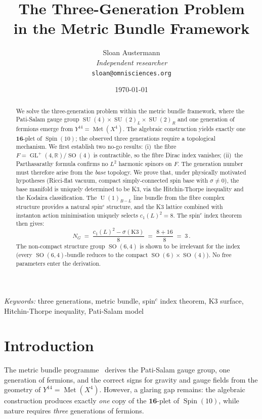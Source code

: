 \documentclass[12pt,a4paper]{article}
\title{\textbf{The Three-Generation Problem\\ in the Metric Bundle Framework}}
\author{Sloan Austermann\\[4pt]
\small\textit{Independent researcher}\\
\small\texttt{sloan@omnisciences.org}}
\date{\today}
\theoremstyle{definition}
\newcommand{\Met}{\operatorname{Met}}
\newcommand{\GL}{\operatorname{GL}}
\newcommand{\SO}{\operatorname{SO}}
\newcommand{\SU}{\operatorname{SU}}
\newcommand{\U}{\operatorname{U}}
\newcommand{\Spin}{\operatorname{Spin}}
\newcommand{\R}{\mathbb{R}}
\begin{document}
\maketitle

\begin{abstract}
We solve the three-generation problem within the metric bundle framework, where the Pati-Salam gauge group $\SU(4) \times \SU(2)_L \times \SU(2)_R$ and one generation of fermions emerge from $Y^{14} = \Met(X^4)$.
The algebraic construction yields exactly one $\mathbf{16}$-plet of $\Spin(10)$; the observed three generations require a topological mechanism.
We first establish two no-go results: (i)~the fibre $F = \GL^+(4,\R)/\SO(4)$ is contractible, so the fibre Dirac index vanishes; (ii)~the Parthasarathy formula confirms no $L^2$ harmonic spinors on $F$.
The generation number must therefore arise from the \emph{base} topology.
We prove that, under physically motivated hypotheses (Ricci-flat vacuum, compact simply-connected spin base with $\sigma \neq 0$), the base manifold is uniquely determined to be K3, via the Hitchin-Thorpe inequality and the Kodaira classification.
The $\U(1)_{B-L}$ line bundle from the fibre complex structure provides a natural spin$^c$ structure, and the K3 lattice combined with instanton action minimisation uniquely selects $c_1(L)^2 = 8$.
The spin$^c$ index theorem then gives:
\[
N_G \;=\; \frac{c_1(L)^2 - \sigma(\mathrm{K3})}{8} \;=\; \frac{8 + 16}{8} \;=\; 3\,.
\]
The non-compact structure group $\SO(6,4)$ is shown to be irrelevant for the index (every $\SO(6,4)$-bundle reduces to the compact $\SO(6) \times \SO(4)$).
No free parameters enter the derivation.
\end{abstract}

\vspace{10pt}
\noindent\textit{Keywords:} three generations, metric bundle, spin$^c$ index theorem, K3 surface, Hitchin-Thorpe inequality, Pati-Salam model

\newpage
\tableofcontents
\newpage

\section{Introduction}
\label{sec:intro}

The metric bundle programme~\cite{Paper1,Paper2,Paper3,Paper4} derives the Pati-Salam gauge group, one generation of fermions, and the correct signs for gravity and gauge fields from the geometry of $Y^{14} = \Met(X^4)$.
However, a glaring gap remains: the algebraic construction produces exactly \emph{one} copy of the $\mathbf{16}$-plet of $\Spin(10)$, while nature requires \emph{three} generations of fermions.
\end{document}
